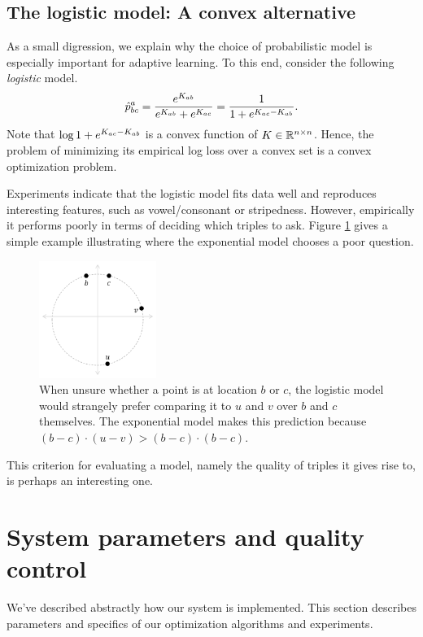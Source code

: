 \documentclass{article}
\begin{document}
\subsection{The logistic model: A convex alternative}\label{sec:logistic}
As a small digression, we explain why the choice of probabilistic model is especially important for adaptive learning.  To this end, consider the following {\em logistic} model.
\begin{equation}\label{eq:logistic}
\hat{p}^a_{bc} = \frac{e^{\S_{ab}}}{e^{\S_{ab}}+e^{\S_{ac}}} = \frac{1}{1+e^{\S_{ac}-\S_{ab}}}.
\end{equation}
Note that $\log 1+e^{\S_{ac}-\S_{ab}}$ is a convex function of $\S\in \reals^{n\times n}$.  Hence, the problem of minimizing its empirical log loss over a convex set is a convex optimization problem.  

Experiments indicate that the logistic model fits data well and reproduces interesting features, such as vowel/consonant or stripedness.  However, empirically it performs poorly in terms of deciding which triples to ask.  Figure \ref{fig:exp} gives a simple example illustrating where the exponential model chooses a poor question.


\begin{figure}
\centering
\includegraphics[width=1.5in]{expfig.pdf} \caption{\label{fig:exp} When unsure whether a point is at location $b$ or $c$, the logistic model would strangely prefer comparing it to $u$ and $v$ over $b$ and $c$ themselves.  The exponential model makes this prediction because $(b-c) \cdot (u-v) > (b-c)\cdot (b-c)$.}
\end{figure}

This criterion for evaluating a model, namely the quality of triples it gives rise to, is perhaps an interesting one.

\section{System parameters and quality control}\label{sec:params}
We've described abstractly how our system is implemented.  This
section describes parameters and specifics of our optimization
algorithms and experiments.
\end{document}
